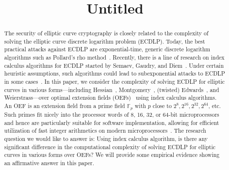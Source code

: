 \documentclass{llncs}
\newcommand{\F}[1]{\ensuremath{\mathbb F_{#1}}}
\begin{document}
%
\title{Untitled}
%
%
%
%

\maketitle              %

\begin{abstract}
%
  The security of elliptic curve cryptography is closely related to
  the complexity of solving the elliptic curve discrete logarithm
  problem (ECDLP).
%
  Today, the best practical attacks against ECDLP are
  exponential-time, generic discrete logarithm algorithms such as
  Pollard's rho method~\cite{1978-pollard-kangaroo}.
%
  Recently, there is a line of research on index calculus algorithms
  for ECDLP started by Semaev, Gaudry, and
  Diem~\cite{DBLP:journals/iacr/Semaev04,DBLP:journals/jsc/Gaudry09,DBLP:journals/moc/Diem11}.
%
  Under certain heuristic assumptions, such algorithms could lead to
  subexponential attacks to ECDLP in some
  cases~\cite{DBLP:conf/eurocrypt/FaugerePPR12,DBLP:journals/iacr/PetitQ12,DBLP:conf/iwsec/HuangPST13}.
%
  In this paper, we consider the complexity of solving ECDLP for
  elliptic curves in various forms---including
  Hessian~\cite{DBLP:conf/ches/Smart01},
  Montgomery~\cite{1987-montgomery}, (twisted)
  Edwards~\cite{DBLP:journals/iacr/BernsteinL07,DBLP:journals/iacr/BernsteinBJLP08},
  and Weierstrass---over optimal extension fields
  (OEFs)~\cite{DBLP:conf/crypto/BaileyP98} using index calculus
  algorithms.
%
  An OEF is an extension field from a prime field \F p with $p$ close
  to $2^8, 2^{16}, 2^{32}, 2^{64}$, etc.
%
  Such primes fit nicely into the processor words of 8, 16, 32, or
  64-bit microprocessors and hence are particularly suitable for
  software implementation, allowing for efficient utilization of fast
  integer arithmetics on modern
  microprocessors~\cite{DBLP:conf/crypto/BaileyP98}.
%
  The research question we would like to answer is: Using index
  calculus algorithm, is there any significant difference in the
  computational complexity of solving ECDLP for elliptic curves in
  various forms over OEFs?
%
  We will provide some empirical evidence showing an affirmative
  answer in this paper.
%
\end{abstract}









%
%


\end{document}
